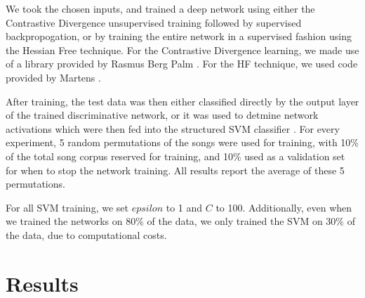 \documentclass{article}
\begin{document}
We took the chosen inputs, and trained a deep network using either the
Contrastive Divergence unsupervised training followed by supervised
backpropogation, or by training the entire network in a supervised fashion
using the Hessian Free technique. For the Contrastive Divergence learning, we
made use of a library provided by Rasmus Berg Palm \cite{IMM2012-06284}. For
the HF technique, we used code provided by Martens \cite{martens2010deep}.

After training, the test data was then either classified directly by the output
layer of the trained discriminative network, or it was used to detmine network
activations which were then fed into the structured SVM classifier
\cite{joachims1999making}. For every experiment, 5 random permutations of the
songs were used for training, with 10\% of the total song corpus reserved for
training, and 10\% used as a validation set for when to stop the network
training. All results report the average of these 5 permutations.

For all SVM training, we set $epsilon$ to 1 and $C$ to 100. Additionally,
even when we trained the networks on 80\% of the data, we only trained the
SVM on 30\% of the data, due to computational costs.

\section{Results}
\label{sec:results}



\end{document}
